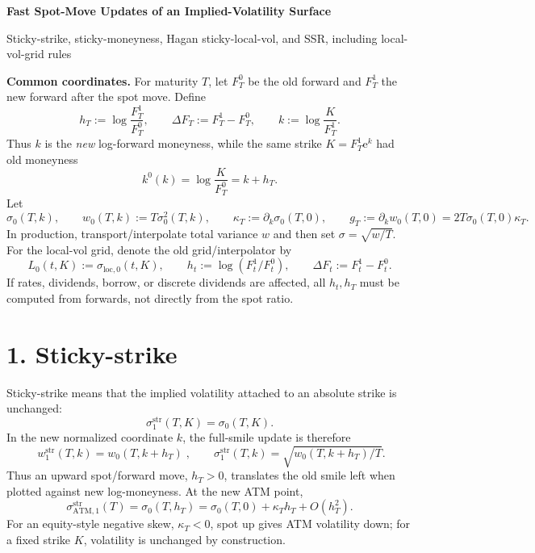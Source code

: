 \documentclass[8pt]{extarticle}
\newcommand{\sig}{\sigma}
\newcommand{\w}{w}
\newcommand{\ATM}{\mathrm{ATM}}
\newcommand{\loc}{\mathrm{loc}}
\newcommand{\str}{\mathrm{str}}
\newcommand{\e}{\mathrm{e}}
\begin{document}
\begin{center}
{\large\bfseries Fast Spot-Move Updates of an Implied-Volatility Surface}\vspace{1pt}

{\small Sticky-strike, sticky-moneyness, Hagan sticky-local-vol, and SSR, including local-vol-grid rules}\vspace{1pt}
\end{center}

\textbf{Common coordinates.}
For maturity $T$, let $F_T^0$ be the old forward and $F_T^1$ the new forward after the spot move. Define
\[
        h_T:=\log\frac{F_T^1}{F_T^0},\qquad
        \Delta F_T:=F_T^1-F_T^0,\qquad
        k:=\log\frac{K}{F_T^1} .
\]
Thus $k$ is the \emph{new} log-forward moneyness, while the same strike $K=F_T^1\e^k$ had old moneyness
\[
        k^0(k)=\log\frac{K}{F_T^0}=k+h_T .
\]
Let
\[
        \sig_0(T,k),\qquad \w_0(T,k):=T\sig_0^2(T,k),\qquad
        \kappa_T:=\partial_k\sig_0(T,0),\qquad
        g_T:=\partial_k\w_0(T,0)=2T\sig_0(T,0)\kappa_T .
\]
In production, transport/interpolate total variance $\w$ and then set $\sig=\sqrt{\w/T}$. For the local-vol grid, denote the old grid/interpolator by
\[
        L_0(t,K):=\sig_{\loc,0}(t,K),
        \qquad h_t:=\log(F_t^1/F_t^0),\qquad \Delta F_t:=F_t^1-F_t^0.
\]
If rates, dividends, borrow, or discrete dividends are affected, all $h_t,h_T$ must be computed from forwards, not directly from the spot ratio.

\section*{1. Sticky-strike}
Sticky-strike means that the implied volatility attached to an absolute strike is unchanged:
\[
        \sig_1^{\str}(T,K)=\sig_0(T,K).
\]
In the new normalized coordinate $k$, the full-smile update is therefore
\[
        \boxed{\;\w_1^{\str}(T,k)=\w_0(T,k+h_T)\;},
        \qquad
        \sig_1^{\str}(T,k)=\sqrt{\w_0(T,k+h_T)/T} .
\]
Thus an upward spot/forward move, $h_T>0$, translates the old smile left when plotted against new log-moneyness. At the new ATM point,
\[
        \sig_{\ATM,1}^{\str}(T)=\sig_0(T,h_T)
        =\sig_0(T,0)+\kappa_T h_T+O(h_T^2).
\]
For an equity-style negative skew, $\kappa_T<0$, spot up gives ATM volatility down; for a fixed strike $K$, volatility is unchanged by construction.
\end{document}
